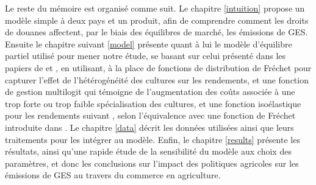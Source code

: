 Le reste du mémoire est organisé comme suit. Le chapitre \ref{intuition} propose un modèle simple à deux pays et un produit, afin de comprendre comment les droits de douanes affectent, par le biais des équilibres de marché, les émissions de GES. Ensuite le chapitre suivant \ref{model} présente quant à lui le modèle d’équilibre partiel utilisé pour mener notre étude, se basant sur celui présenté dans les papiers de \cite{Gouel2021} et \cite{Gouel2025}, en utilisant, à la place de fonctions de distribution de Fréchet pour capturer l’effet de l’hétérogénéité des cultures sur les rendements, et une fonction de gestion multilogit qui témoigne de l’augmentation des coûts associée à une trop forte ou trop faible spécialisation des cultures, et une fonction isoélastique pour les rendements suivant \cite{Carpentier2013}, selon l'équivalence avec une fonction de Fréchet introduite dans \cite{Gouel202x}. Le chapitre \ref{data} décrit les données utilisées ainsi que leurs traitements pour les intégrer au modèle. Enfin, le chapitre \ref{results} présente les résultats, ainsi qu'une rapide étude de la sensibilité du modèle aux choix des paramètres, et donc les conclusions sur l’impact des politiques agricoles sur les émissions de GES au travers du commerce en agriculture.
